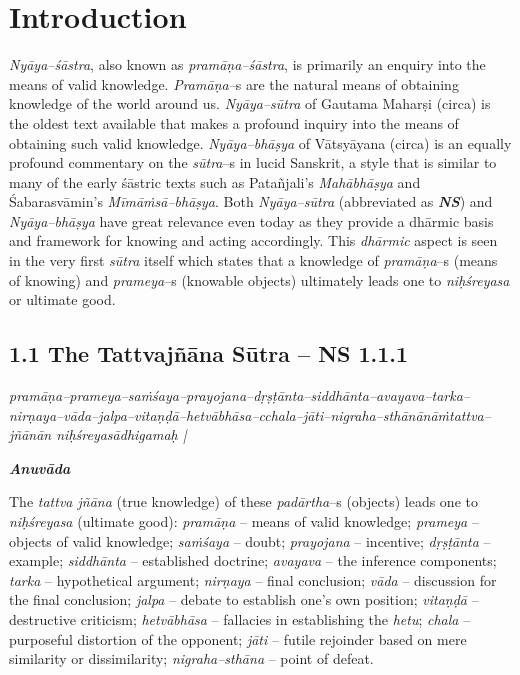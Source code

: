 
\chapter{Introduction}\label{chapter1}

\textit{Nyāya–śāstra}, also known as \textit{pramāṇa–śāstra}, is primarily an enquiry into the means of valid knowledge. \textit{Pramāṇa–}s are the natural means of obtaining knowledge of the world around us. \textit{Nyāya–sūtra} of Gautama Maharṣi (circa) is the oldest text available that makes a profound inquiry into the means of obtaining such valid knowledge. \textit{Nyāya–bhāṣya} of Vātsyāyana (circa) is an equally profound commentary on the \textit{sūtra}–s in lucid Sanskrit, a style that is similar to many of the early śāstric texts such as Patañjali’s \textit{Mahābhāṣya} and Śabarasvāmin’s \textit{Mīmāṁsā–bhāṣya}. Both \textit{Nyāya–sūtra }(abbreviated as \textit{\textbf{NS}}) and \textit{Nyāya–bhāṣya} have great relevance even today as they provide a dhārmic basis and framework for knowing and acting accordingly. This \textit{dhārmic} aspect is seen in the very first \textit{sūtra} itself which states that a knowledge of \textit{pramāṇa}–s (means of knowing) and \textit{prameya}–s (knowable objects) ultimately leads one to \textit{niḥśreyasa} or ultimate good.

\section*{1.1 The Tattvajñāna Sūtra – NS 1.1.1}

\begin{myquote}
\textit{pramāṇa–prameya–saṁśaya–prayojana–dṛṣṭānta–siddhānta–avayava–tarka–\break nirṇaya–vāda–jalpa–vitaṇḍā–hetvābhāsa–cchala–jāti–nigraha–sthānānāṁ\break tattva–jñānān niḥśreyasādhigamaḥ |}
\end{myquote}

\textit{\textbf{Anuvāda}}

The \textit{tattva jñāna} (true knowledge) of these \textit{padārtha}–s (objects) leads one to \textit{niḥśreyasa} (ultimate good): \textit{pramāṇa} – means of valid knowledge; \textit{prameya} – objects of valid knowledge; \textit{saṁśaya} – doubt; \textit{prayojana} – incentive; \textit{dṛṣṭānta} – example; \textit{siddhānta} – established doctrine; \textit{avayava} – the inference components; \textit{tarka} – hypothetical argument; \textit{nirṇaya} – final conclusion; \textit{vāda} – discussion for the final conclusion; \textit{jalpa} – debate to establish one’s own position; \textit{vitaṇḍā} – destructive criticism; \textit{hetvābhāsa} – fallacies in establishing the \textit{hetu}; \textit{chala} – purposeful distortion of the opponent; \textit{jāti} – futile rejoinder based on mere similarity or dissimilarity; \textit{nigraha–sthāna} – point of defeat.

